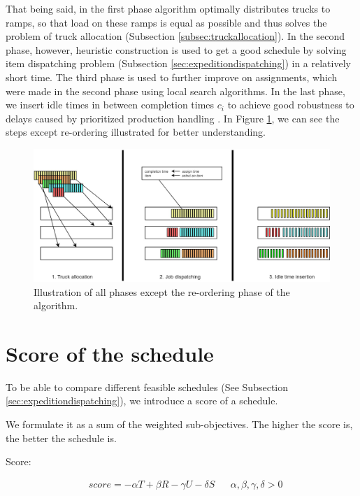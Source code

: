\documentclass{ctuthesis}
\begin{document}
That being said, in the first phase algorithm optimally distributes trucks to ramps, so that load on these ramps is equal as possible and thus solves the problem of truck allocation (Subsection \ref{subsec:truckallocation}). In the second phase, however, heuristic construction is used to get a good schedule by solving item dispatching problem (Subsection \ref{sec:expeditiondispatching}) in a relatively short time. The third phase is used to further improve on assignments, which were made in the second phase using local search algorithms. In the last phase, we insert idle times in between completion times $c_i$ to achieve good robustness to delays caused by prioritized production handling \cite{pinedo}. In Figure \ref{fig:algo}, we can see the steps except re-ordering illustrated for better understanding.

\begin{figure}[H]
\includegraphics[width=1.0\linewidth]{algo.jpg}
\caption{Illustration of all phases except the re-ordering phase of the algorithm.}
\label{fig:algo}
\end{figure}

\section{Score of the schedule}
\label{sec:score}

To be able to compare different feasible schedules (See Subsection \ref{sec:expeditiondispatching}), we introduce a score of a schedule. 

We formulate it as a sum of the weighted sub-objectives. The higher the score is, the better the schedule is.

Score:

\begin{equation}
\begin{aligned}
    &score = -\alpha T + \beta R - \gamma  U - \delta S && \alpha, \beta, \gamma, \delta > 0
\end{aligned}
\end{equation}
\end{document}
